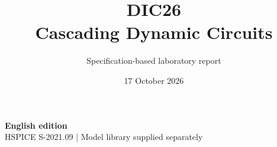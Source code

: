 \documentclass[11pt,a4paper]{article}
\title{\color{accent}DIC26\\[4pt]Cascading Dynamic Circuits}
\author{Specification-based laboratory report}
\date{17 October 2026}
\begin{document}
\maketitle
\begin{center}\small\textbf{English edition}\\
HSPICE S-2021.09 \quad | \quad Model library supplied separately
\end{center}


\end{document}
